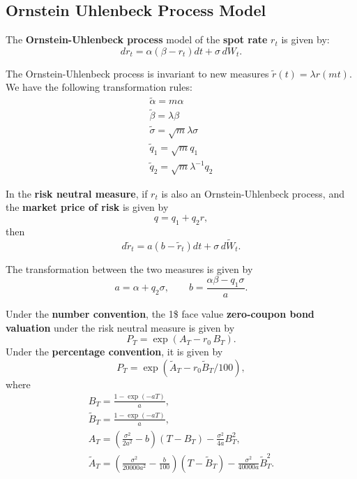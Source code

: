 \subsection{Ornstein Uhlenbeck Process Model}
\begin{outline}
  \1 The \textbf{Ornstein-Uhlenbeck process} model of the \textbf{spot rate} $r_t$ is
  given by:
  \begin{equation*}
    dr_t = \alpha(\beta - r_t)dt + \sigma\,dW_t.
  \end{equation*}

  \1 The Ornstein-Uhlenbeck process is invariant to new measures
  $\tilde r(t) = \lambda r(mt)$. We have the following transformation rules:
  \begin{gather*}
    \tilde\alpha = m\alpha\\
    \tilde\beta = \lambda\beta\\
    \tilde\sigma = \sqrt{m}\lambda\sigma\\
    \tilde q_1 = \sqrt{m}q_1\\
    \tilde q_2 = \sqrt{m}\lambda^{-1}q_2
  \end{gather*}

  \1 In the \textbf{risk neutral measure}, if $r_t$ is also an Ornstein-Uhlenbeck process,
  and the \textbf{market price of risk} is given by
  \begin{equation*}
    q = q_1 + q_2r,
  \end{equation*}
  then
  \begin{equation*}
    d\tilde r_t = a(b - \tilde r_t)dt + \sigma\,d\tilde W_t.
  \end{equation*}

  \1 The transformation between the two measures is given by
  \begin{equation*}
    a = \alpha + q_2\sigma,\qquad b = \frac{\alpha\beta - q_1\sigma}{a}.
  \end{equation*}

  \1 Under the \textbf{number convention}, the 1\$ face value \textbf{zero-coupon bond
    valuation} under the risk neutral measure is given by
  \begin{equation*}
    P_T = \exp(A_T - r_0\,B_T).
  \end{equation*}
  Under the \textbf{percentage convention}, it is given by
  \begin{equation*}
    P_T = \exp(\tilde A_T - r_0\tilde B_T/100),
  \end{equation*}
  where
  \begin{gather*}
    B_T = \frac{1-\exp(-aT)}{a},\\
    \tilde B_T = \frac{1-\exp(-aT)}{a},\\
    A_T = \left(\frac{\sigma^2}{2a^2}-b\right)(T - B_T) - \frac{\sigma^2}{4a}B_T^2,\\
    \tilde A_T = \left(\frac{\sigma^2}{\num{20000}a^2}-\frac{b}{100}\right)(T - \tilde
    B_T) - \frac{\sigma^2}{\num{40000}a} \tilde B_T^2.
  \end{gather*}


\end{outline}
